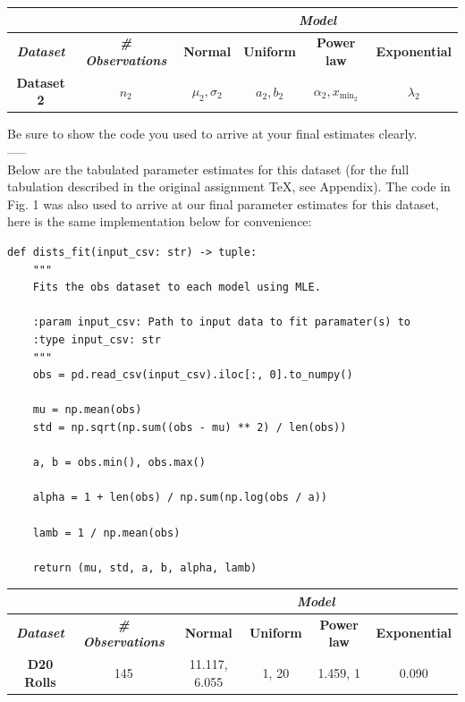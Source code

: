 \begin{center}
\begin{tabular}{|c|c|c|c|c|c|}
\hline
& & \multicolumn{4}{c|}{{\bf{\em{Model}}}}\\
\hline
{{\bf{\em{Dataset}}}} & {\bf{\em{\# Observations}}} &\textbf{Normal}& \textbf{Uniform} & \textbf{Power law} & \textbf{Exponential} \\
\hline
\textbf{Dataset 2} & $n_2$ & $\mu_2, \sigma_2$ & $a_2, b_2$ & $\alpha_2, x_{\min_2}$ & $\lambda_2$ \\
\hline
\end{tabular}
\end{center}

Be sure to show the code you used to arrive at your final estimates clearly.\\
-----\\
Below are the tabulated parameter estimates for this dataset (for the full tabulation described in the original assignment TeX, see Appendix). The code in Fig. 1 was also used to arrive at our final parameter estimates for this dataset, here is the same implementation below for convenience:\\

\begin{verbatim}
def dists_fit(input_csv: str) -> tuple:
    """
    Fits the obs dataset to each model using MLE.

    :param input_csv: Path to input data to fit paramater(s) to
    :type input_csv: str
    """
    obs = pd.read_csv(input_csv).iloc[:, 0].to_numpy()

    mu = np.mean(obs)
    std = np.sqrt(np.sum((obs - mu) ** 2) / len(obs))

    a, b = obs.min(), obs.max()

    alpha = 1 + len(obs) / np.sum(np.log(obs / a))

    lamb = 1 / np.mean(obs)

    return (mu, std, a, b, alpha, lamb)
\end{verbatim}

\vspace{4pt}

\begin{center}
\begin{tabular}{|c|c|c|c|c|c|}
\hline
& & \multicolumn{4}{c|}{{\bf{\em{Model}}}}\\
\hline
{{\bf{\em{Dataset}}}} & {\bf{\em{\# Observations}}} &\textbf{Normal}& \textbf{Uniform} & \textbf{Power law} & \textbf{Exponential} \\
\hline
\textbf{D20 Rolls} & 145 & 11.117, 6.055 & 1, 20 & 1.459, 1 & 0.090 \\
\hline
\end{tabular}
\end{center}

